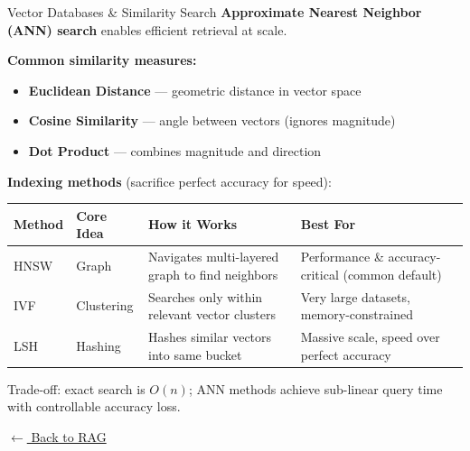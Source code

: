 \documentclass[aspectratio=169]{beamer}
\begin{document}

\begin{frame}{Vector Databases \& Similarity Search}
  \hypertarget{vector-db}{}
  \footnotesize
  \textbf{Approximate Nearest Neighbor (ANN) search} enables efficient retrieval at scale.

  \vspace{6pt}
  \textbf{Common similarity measures:}
  \begin{itemize}[itemsep=1pt,topsep=2pt]
    \footnotesize
    \item \textbf{Euclidean Distance} --- geometric distance in vector space
    \item \textbf{Cosine Similarity} --- angle between vectors (ignores magnitude)
    \item \textbf{Dot Product} --- combines magnitude and direction
  \end{itemize}

  \vspace{8pt}
  \textbf{Indexing methods} (sacrifice perfect accuracy for speed):

  \vspace{4pt}
  \begin{center}
  \scriptsize
  \setlength{\tabcolsep}{4pt}
  \begin{tabular}{p{1.2cm}p{1.5cm}p{4.0cm}p{5.0cm}}
    \toprule
    \textbf{Method} & \textbf{Core Idea} & \textbf{How it Works} & \textbf{Best For} \\
    \midrule
    HNSW & Graph & Navigates multi-layered graph to find neighbors & Performance \& accuracy-critical (common default) \\
    IVF & Clustering & Searches only within relevant vector clusters & Very large datasets, memory-constrained \\
    LSH & Hashing & Hashes similar vectors into same bucket & Massive scale, speed over perfect accuracy \\
    \bottomrule
  \end{tabular}
  \end{center}

  \vspace{4pt}
  {\footnotesize\color{NoteGray} Trade-off: exact search is $O(n)$; ANN methods achieve sub-linear query time with controllable accuracy loss.}

  \vspace{6pt}
  {\footnotesize\color{AtlasCool} \hyperlink{rag-main}{$\leftarrow$ Back to RAG}}
\end{frame}
\end{document}
